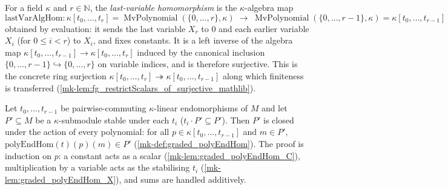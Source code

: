 \begin{definition}\label{mk-lem:graded_lastVarAlgHom}
  \leanok







  For a field \(\kappa\) and \(r \in \mathbb{N}\), the \emph{last-variable
  homomorphism} is the \(\kappa\)-algebra map
  \[
    \mathrm{lastVarAlgHom} : \kappa[t_0, \dots, t_r]
      = \operatorname{MvPolynomial}(\{0,\dots,r\}, \kappa)
      \;\longrightarrow\;
      \operatorname{MvPolynomial}(\{0,\dots,r-1\}, \kappa) = \kappa[t_0, \dots, t_{r-1}]
  \]
  obtained by evaluation: it sends the last variable \(X_r\) to \(0\) and each
  earlier variable \(X_i\) (for \(0 \le i < r\)) to \(X_i\), and fixes constants.
  It is a left inverse of the algebra map
  \(\kappa[t_0, \dots, t_{r-1}] \to \kappa[t_0, \dots, t_r]\)
  induced by the canonical inclusion \(\{0, \dots, r-1\} \hookrightarrow \{0, \dots, r\}\)
  on variable indices, and is therefore surjective. This is the concrete
  ring surjection \(\kappa[t_0, \dots, t_r] \twoheadrightarrow
  \kappa[t_0, \dots, t_{r-1}]\) along which finiteness is transferred
  (\ref{mk-lem:fg_restrictScalars_of_surjective_mathlib}).
\end{definition}

\begin{lemma}\label{mk-lem:graded_polyEndHom_mem_of_stable}
  \leanok

  Let \(t_0, \dots, t_{r-1}\) be pairwise-commuting \(\kappa\)-linear endomorphisms
  of \(M\) and let \(P' \subseteq M\) be a \(\kappa\)-submodule stable under each
  \(t_i\) (\(t_i \cdot P' \subseteq P'\)). Then \(P'\) is closed under the action of
  every polynomial: for all \(p \in \kappa[t_0, \dots, t_{r-1}]\) and \(m \in P'\),
  \(\mathrm{polyEndHom}(t)(p)(m) \in P'\) (\ref{mk-def:graded_polyEndHom}). The proof
  is induction on \(p\): a constant acts as a scalar (\ref{mk-lem:graded_polyEndHom_C}),
  multiplication by a variable acts as the stabilising \(t_i\)
  (\ref{mk-lem:graded_polyEndHom_X}), and sums are handled additively.
\end{lemma}

